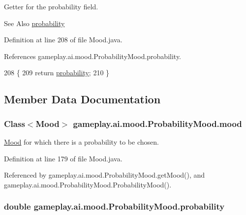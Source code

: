 Getter for the probability field. 

\begin{DoxySeeAlso}{See Also}
\hyperlink{classgameplay_1_1ai_1_1mood_1_1_probability_mood_a44377e9c9418a71f5151439c58f7b555}{probability} 
\end{DoxySeeAlso}


Definition at line 208 of file Mood.\-java.



References gameplay.\-ai.\-mood.\-Probability\-Mood.\-probability.


\begin{DoxyCode}
208                                    \{
209         \textcolor{keywordflow}{return} \hyperlink{classgameplay_1_1ai_1_1mood_1_1_probability_mood_a44377e9c9418a71f5151439c58f7b555}{probability};
210     \}
\end{DoxyCode}


\subsection{Member Data Documentation}
\hypertarget{classgameplay_1_1ai_1_1mood_1_1_probability_mood_afe864a647d2e9d766688d5e7549feec4}{
\subsubsection[{mood}]{\setlength{\rightskip}{0pt plus 5cm}Class$<${\bf Mood}$>$ gameplay.\-ai.\-mood.\-Probability\-Mood.\-mood\hspace{0.3cm}{\ttfamily [protected]}}}\label{classgameplay_1_1ai_1_1mood_1_1_probability_mood_afe864a647d2e9d766688d5e7549feec4}


\hyperlink{classgameplay_1_1ai_1_1mood_1_1_mood}{Mood} for which there is a probability to be chosen. 



Definition at line 179 of file Mood.\-java.



Referenced by gameplay.\-ai.\-mood.\-Probability\-Mood.\-get\-Mood(), and gameplay.\-ai.\-mood.\-Probability\-Mood.\-Probability\-Mood().

\hypertarget{classgameplay_1_1ai_1_1mood_1_1_probability_mood_a44377e9c9418a71f5151439c58f7b555}{
\subsubsection[{probability}]{\setlength{\rightskip}{0pt plus 5cm}double gameplay.\-ai.\-mood.\-Probability\-Mood.\-probability\hspace{0.3cm}{\ttfamily [protected]}}}\label{classgameplay_1_1ai_1_1mood_1_1_probability_mood_a44377e9c9418a71f5151439c58f7b555}


